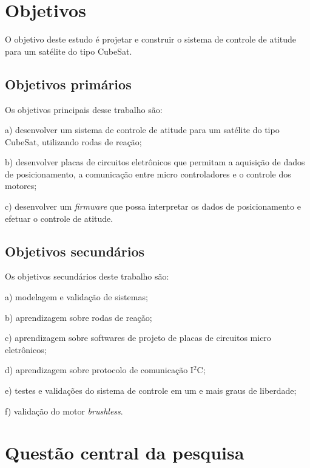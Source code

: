 \documentclass[
	12pt,				%
	openany,			%
	twoside,			%
	a4paper,			%
	english,			%
	french,				%
	spanish,			%
	brazil,				%
	oldfontcommands
	]{abntex2}
\begin{document}
\section{Objetivos}

O objetivo deste estudo é projetar e construir o sistema de controle de atitude para um satélite do tipo CubeSat.

\subsection[Objetivos primários]{Objetivos primários}

Os objetivos principais desse trabalho são:

a)	desenvolver um sistema de controle de atitude para um satélite do tipo CubeSat, utilizando rodas de reação;

b)	desenvolver placas de circuitos eletrônicos que permitam a aquisição de dados de posicionamento, a comunicação entre micro controladores e o controle dos motores;

c)	desenvolver um \textit{firmware} que possa interpretar os dados de posicionamento e efetuar o controle de atitude.

\subsection[Objetivos secundários]{Objetivos secundários}

Os objetivos secundários deste trabalho são:

a)	modelagem e validação de sistemas;

b)	aprendizagem sobre rodas de reação;

c)	aprendizagem sobre softwares de projeto de placas de circuitos micro eletrônicos;

d)	aprendizagem sobre protocolo de comunicação I$^{2}$C;

e)	testes e validações do sistema de controle em um e mais graus de liberdade;

f) validação do motor \textit{brushless}.

\section{Questão central da pesquisa}
\end{document}

